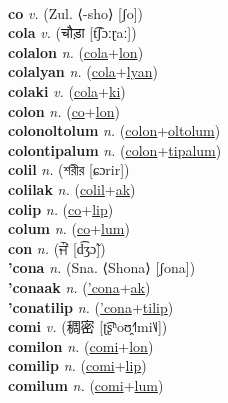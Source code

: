  \label{'caputitec} \\
\textbf{co} \textit{v.} (Zul. ⟨-sho⟩ [ʃo])
 \label{co} \\
\textbf{cola} \textit{v.} ({\devanagari{}चौड़ा} [t͡ʃɔːɽaː])
 \label{cola} \\
\textbf{colalon} \textit{n.} (\hyperref[cola]{cola}+\hyperref[lon]{lon})
 \label{colalon} \\
\textbf{colalyan} \textit{n.} (\hyperref[cola]{cola}+\hyperref[lyan]{lyan})
 \label{colalyan} \\
\textbf{colaki} \textit{v.} (\hyperref[cola]{cola}+\hyperref[ki]{ki})
 \label{colaki} \\
\textbf{colon} \textit{n.} (\hyperref[co]{co}+\hyperref[lon]{lon})
 \label{colon} \\
\textbf{colonoltolum} \textit{n.} (\hyperref[colon]{colon}+\hyperref[oltolum]{oltolum})
 \label{colonoltolum} \\
\textbf{colontipalum} \textit{n.} (\hyperref[colon]{colon}+\hyperref[tipalum]{tipalum})
 \label{colontipalum} \\
\textbf{colil} \textit{n.} ({\bengali{}শরীর} [ɕɔrir])
 \label{colil} \\
\textbf{colilak} \textit{n.} (\hyperref[colil]{colil}+\hyperref[ak]{ak})
 \label{colilak} \\
\textbf{colip} \textit{n.} (\hyperref[co]{co}+\hyperref[lip]{lip})
 \label{colip} \\
\textbf{colum} \textit{n.} (\hyperref[co]{co}+\hyperref[lum]{lum})
 \label{colum} \\
\textbf{con} \textit{n.} ({\gurmukhi{}ਜੌਂ} [d͡ʒɔ̃])
 \label{con} \\
\textbf{'cona} \textit{n.} (Sna. ⟨Shona⟩ [ʃona])
 \label{'cona} \\
\textbf{'conaak} \textit{n.} (\hyperref['cona]{'cona}+\hyperref[ak]{ak})
 \label{'conaak} \\
\textbf{'conatilip} \textit{n.} (\hyperref['cona]{'cona}+\hyperref[tilip]{tilip})
 \label{'conatilip} \\
\textbf{comi} \textit{v.} ({\chinese{}稠密} [ʈ͡ʂʰoʊ̯˧˥mi˥˩])
 \label{comi} \\
\textbf{comilon} \textit{n.} (\hyperref[comi]{comi}+\hyperref[lon]{lon})
 \label{comilon} \\
\textbf{comilip} \textit{n.} (\hyperref[comi]{comi}+\hyperref[lip]{lip})
 \label{comilip} \\
\textbf{comilum} \textit{n.} (\hyperref[comi]{comi}+\hyperref[lum]{lum})
 \label{comilum} \\
